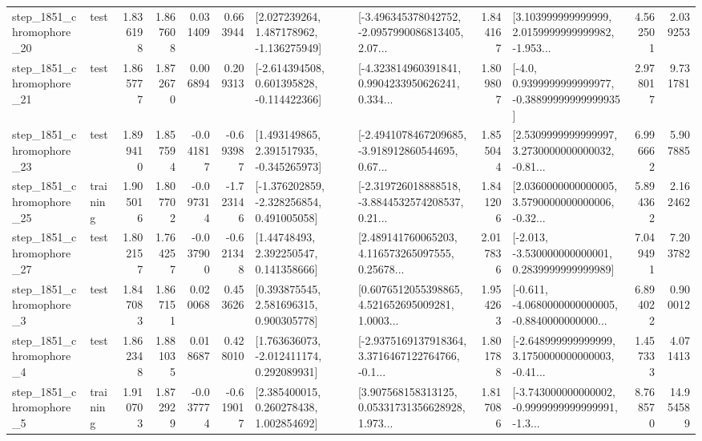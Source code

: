 \begin{tabular}{llrrrrllrlrr}
 step\_1851\_chromophore\_20 &      test &      1.836198 &    1.867608 &      0.031409 &  0.663944 &    [2.027239264, 1.487178962, -1.136275949] &  [-3.496345378042752, -2.0957990086813405, 2.07... &       1.844167 &  [3.103999999999999, 2.0159999999999982, -1.953... &            4.562501 &          2.039253 \\
 step\_1851\_chromophore\_21 &      test &      1.865777 &    1.872670 &      0.006894 &  0.209313 &   [-2.614394508, 0.601395828, -0.114422366] &  [-4.323814960391841, 0.9904233950626241, 0.334... &       1.809807 &   [-4.0, 0.9399999999999977, -0.38899999999999935] &            2.978017 &          9.731781 \\
 step\_1851\_chromophore\_23 &      test &      1.899410 &    1.857594 &     -0.041817 & -0.693987 &    [1.493149865, 2.391517935, -0.345265973] &  [-2.4941078467209685, -3.918912860544695, 0.67... &       1.855044 &  [2.5309999999999997, 3.2730000000000032, -0.81... &            6.996662 &          5.907885 \\
 step\_1851\_chromophore\_25 &  training &      1.905016 &    1.807702 &     -0.097314 & -1.723146 &   [-1.376202859, -2.328256854, 0.491005058] &  [-2.319726018888518, -3.8844532574208537, 0.21... &       1.841206 &  [2.0360000000000005, 3.5790000000000006, -0.32... &            5.894362 &          2.162462 \\
 step\_1851\_chromophore\_27 &      test &      1.802157 &    1.764257 &     -0.037900 & -0.621348 &      [1.44748493, 2.392250547, 0.141358666] &  [2.489141760065203, 4.116573265097555, 0.25678... &       2.017836 &   [-2.013, -3.530000000000001, 0.2839999999999989] &            7.049491 &          7.203782 \\
  step\_1851\_chromophore\_3 &      test &      1.847083 &    1.867151 &      0.020068 &  0.453626 &     [0.393875545, 2.581696315, 0.900305778] &  [0.6076512055398865, 4.521652695009281, 1.0003... &       1.954263 &  [-0.611, -4.0680000000000005, -0.8840000000000... &            6.894022 &          0.900012 \\
  step\_1851\_chromophore\_4 &      test &      1.862348 &    1.881035 &      0.018687 &  0.428010 &    [1.763636073, -2.012411174, 0.292089931] &  [-2.9375169137918364, 3.3716467122764766, -0.1... &       1.801788 &  [-2.648999999999999, 3.1750000000000003, -0.41... &            1.457333 &          4.071413 \\
  step\_1851\_chromophore\_5 &  training &      1.910703 &    1.872929 &     -0.037774 & -0.619017 &     [2.385400015, 0.260278438, 1.002854692] &  [3.907568158313125, 0.05331731356628928, 1.973... &       1.817086 &  [-3.743000000000002, -0.9999999999999991, -1.3... &            8.768570 &         14.954589 \\

\end{tabular}
